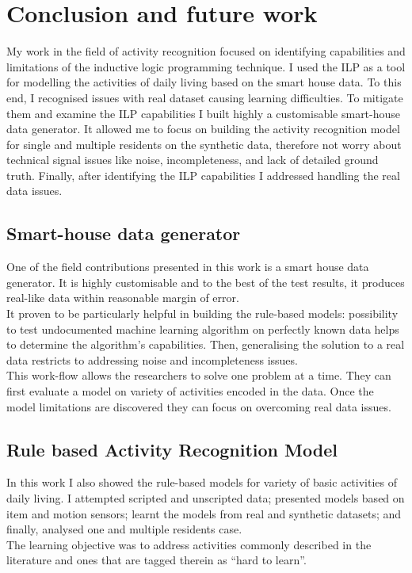 \documentclass[10pt, a4paper, pdflatex, leqno, twoside, openright]{report}
\begin{document}
\chapter{Conclusion and future work\label{ch:summary}}
My work in the field of activity recognition focused on identifying capabilities and limitations of the inductive logic programming technique. I used the ILP as a tool for modelling the activities of daily living based on the smart house data. To this end, I recognised issues with real dataset causing learning difficulties. To mitigate them and examine the ILP capabilities I built highly a customisable smart-house data generator. It allowed me to focus on building the activity recognition model for single and multiple residents on the synthetic data, therefore not worry about technical signal issues like noise, incompleteness, and lack of detailed ground truth. Finally, after identifying the ILP capabilities I addressed handling the real data issues.

  \section{Smart-house data generator} %
One of the field contributions presented in this work is a smart house data generator. It is highly customisable and to the best of the test results, it produces real-like data within reasonable margin of error.\\
It proven to be particularly helpful in building the rule-based models: possibility to test undocumented machine learning algorithm on perfectly known data helps to determine the algorithm's capabilities. Then, generalising the solution to a real data restricts to addressing noise and incompleteness issues.\\
This work-flow allows the researchers to solve one problem at a time. They can first evaluate a model on variety of activities encoded in the data. Once the model limitations are discovered they can focus on overcoming real data issues.

  \section{Rule based Activity Recognition Model}
In this work I also showed the rule-based models for variety of basic activities of daily living. I attempted scripted and unscripted data; presented models based on item and motion sensors; learnt the models from real and synthetic datasets; and finally, analysed one and multiple residents case.\\
The learning objective was to address activities commonly described in the literature and ones that are tagged therein as ``hard to learn''.\\
\end{document}
